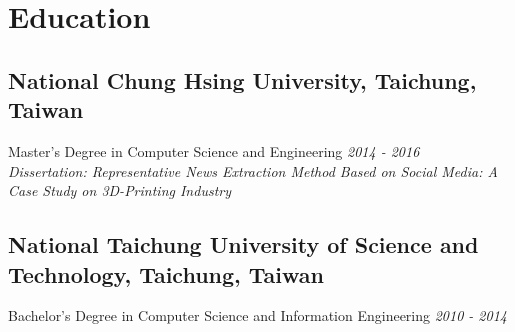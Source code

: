 \documentclass[a4paper,9pt]{extarticle}
\begin{document}
\section*{Education}

\subsection*{National Chung Hsing University, Taichung, Taiwan}
Master's Degree in Computer Science and Engineering \hfill \textit{2014 - 2016} \\
\textit{Dissertation: Representative News Extraction Method Based on Social Media: A Case Study on 3D-Printing Industry}

\subsection*{National Taichung University of Science and Technology, Taichung, Taiwan}
Bachelor's Degree in Computer Science and Information Engineering \hfill \textit{2010 - 2014}
\end{document}
